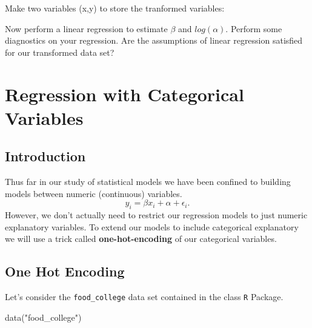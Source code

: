 \documentclass[
]{book}
\newenvironment{Shaded}{\begin{snugshade}}{\end{snugshade}}
\newcommand{\DecValTok}[1]{\textcolor[rgb]{0.00,0.00,0.81}{#1}}
\newcommand{\FunctionTok}[1]{\textcolor[rgb]{0.00,0.00,0.00}{#1}}
\newcommand{\NormalTok}[1]{#1}
\newcommand{\OtherTok}[1]{\textcolor[rgb]{0.56,0.35,0.01}{#1}}
\newcommand{\SpecialCharTok}[1]{\textcolor[rgb]{0.00,0.00,0.00}{#1}}
\newcommand{\StringTok}[1]{\textcolor[rgb]{0.31,0.60,0.02}{#1}}
\theoremstyle{definition}
\theoremstyle{definition}
\theoremstyle{definition}
\theoremstyle{definition}
\theoremstyle{remark}
\begin{document}
Make two variables (x,y) to store the tranformed variables:

\begin{Shaded}
\end{Shaded}

Now perform a linear regression to estimate \(\beta\) and \(log(\alpha)\). Perform some diagnostics on your regression. Are the assumptions of linear regression satisfied for our transformed data set?

\hypertarget{regression-with-categorical-variables}{%
\chapter{Regression with Categorical Variables}\label{regression-with-categorical-variables}}

\hypertarget{introduction-2}{%
\section{Introduction}\label{introduction-2}}

Thus far in our study of statistical models we have been confined to building models between numeric (continuous) variables. \[y_i=\beta x_i+\alpha+\epsilon_i.\] However, we don't actually need to restrict our regression models to just numeric explanatory variables. To extend our models to include categorical explanatory we will use a trick called \textbf{one-hot-encoding} of our categorical variables.

\hypertarget{one-hot-encoding}{%
\section{One Hot Encoding}\label{one-hot-encoding}}

Let's consider the \texttt{food\_college} data set contained in the class \texttt{R} Package.

\begin{Shaded}
\begin{Highlighting}[]
\FunctionTok{data}\NormalTok{(}\StringTok{"food\_college"}\NormalTok{)}
\end{Highlighting}
\end{Shaded}
\end{document}
